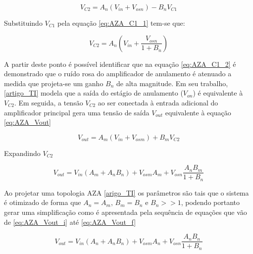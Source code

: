 \documentclass[oneside,openright,12pt]{ufsm_2021} %
\begin{document}
            \begin{equation}
            \label{eq:AZA_C1_1}
                V_{C2}=A_{n}(V_{in}+V_{osn}) - B_{n}V_{C1}
            \end{equation}

            \par Substituindo $V_{C1}$ pela equação \ref{eq:AZA_C1_1} tem-se que:

            \begin{equation}
            \label{eq:AZA_C1_2}
                V_{C2}=A_{n}(V_{in} + \frac{V_{osn}}{1+B_{n}})
            \end{equation}

            \par A partir deste ponto é possível identificar que na equação \ref{eq:AZA_C1_2} é demonstrado que o ruído rosa do amplificador de anulamento é atenuado a medida que projeta-se um ganho $B_{n}$ de alta magnitude. Em seu trabalho, \ref{artigo_TI} modela que a saída do estágio de anulamento ($V_{on}$) é equivalente à $V_{C2}$. Em seguida, a tensão $V_{C2}$ ao ser conectada à entrada adicional do amplificador principal gera uma tensão de saída $V_{out}$ equivalente à equação \ref{eq:AZA_Vout}

            \begin{equation}
            \label{eq:AZA_Vout}
                V_{out}=A_{m}(V_{in}+V_{osm}) + B_{m}V_{C2}
            \end{equation}

            \par Expandindo $V_{C2}$

            \begin{equation}
                V_{out}=V_{in}(A_{m}+A_{n}B_{n}) + V_{osm}A_{m}+ V_{osn}\frac{A_{n}B_{m}}{1+B_{n}}
            \end{equation}

            \par Ao projetar uma topologia AZA \ref{arigo_TI} os parâmetros são tais que o sistema é otimizado de forma que $A_{n}=A_{m}$, $B_{m}=B_{n}$ e $B_{n}>>1$, podendo portanto gerar uma simplificação como é apresentada pela sequência de equações que vão de \ref{eq:AZA_Vout_i} até \ref{eq:AZA_Vout_f}

            \begin{equation}
            \label{eq:AZA_Vout_i}
                V_{out}=V_{in}(A_{n}+A_{n}B_{n}) + V_{osm}A_{n}+ V_{osn}\frac{A_{n}B_{n}}{1+B_{n}}
            \end{equation}
\end{document}
